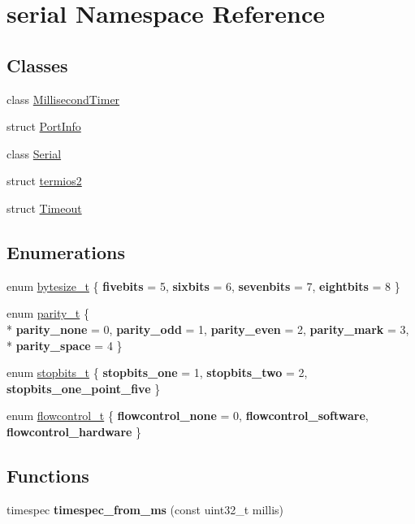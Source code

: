 \hypertarget{namespaceserial}{}\section{serial Namespace Reference}
\label{namespaceserial}
\subsection*{Classes}
\begin{DoxyCompactItemize}
\item 
class \hyperlink{classserial_1_1_millisecond_timer}{Millisecond\+Timer}
\item 
struct \hyperlink{structserial_1_1_port_info}{Port\+Info}
\item 
class \hyperlink{classserial_1_1_serial}{Serial}
\item 
struct \hyperlink{structserial_1_1termios2}{termios2}
\item 
struct \hyperlink{structserial_1_1_timeout}{Timeout}
\end{DoxyCompactItemize}
\subsection*{Enumerations}
\begin{DoxyCompactItemize}
\item 
enum \hyperlink{namespaceserial_a00b3281fa11cea770c0b0c8a106080f8}{bytesize\+\_\+t} \{ {\bfseries fivebits} = 5, 
{\bfseries sixbits} = 6, 
{\bfseries sevenbits} = 7, 
{\bfseries eightbits} = 8
 \}
\item 
enum \hyperlink{namespaceserial_a8f45d26bf7c9a06659e75b5004a50481}{parity\+\_\+t} \{ \\*
{\bfseries parity\+\_\+none} = 0, 
{\bfseries parity\+\_\+odd} = 1, 
{\bfseries parity\+\_\+even} = 2, 
{\bfseries parity\+\_\+mark} = 3, 
\\*
{\bfseries parity\+\_\+space} = 4
 \}
\item 
enum \hyperlink{namespaceserial_af5b116611d6628a3aa8f788fdc09f469}{stopbits\+\_\+t} \{ {\bfseries stopbits\+\_\+one} = 1, 
{\bfseries stopbits\+\_\+two} = 2, 
{\bfseries stopbits\+\_\+one\+\_\+point\+\_\+five}
 \}
\item 
enum \hyperlink{namespaceserial_a93ef57a314b4e562f9eded6c15d34351}{flowcontrol\+\_\+t} \{ {\bfseries flowcontrol\+\_\+none} = 0, 
{\bfseries flowcontrol\+\_\+software}, 
{\bfseries flowcontrol\+\_\+hardware}
 \}
\end{DoxyCompactItemize}
\subsection*{Functions}
\begin{DoxyCompactItemize}
\item 
timespec {\bfseries timespec\+\_\+from\+\_\+ms} (const uint32\+\_\+t millis)\hypertarget{namespaceserial_a09034c92478b6d7f950ecb91f41ff24e}{}\label{namespaceserial_a09034c92478b6d7f950ecb91f41ff24e}

\end{DoxyCompactItemize}


